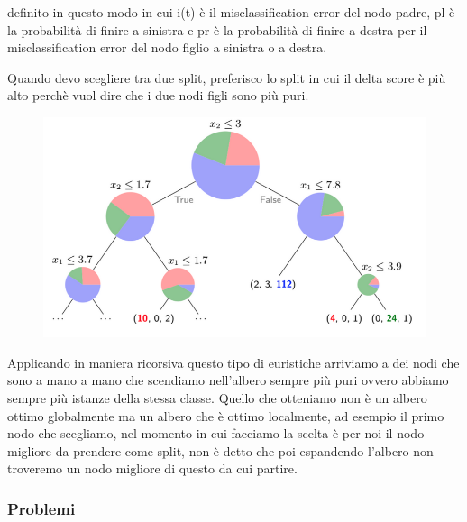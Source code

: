 \documentclass[14pt]{extreport}
\begin{document}
definito in questo modo in cui i(t) è il misclassification error del nodo padre, pl è la probabilità di finire a sinistra e pr è la probabilità di
finire a destra per il misclassification error del nodo figlio a sinistra o a destra.

Quando devo scegliere tra due split, preferisco lo split in cui il delta score è più alto perchè vuol dire che i due nodi figli sono più puri.


\begin{figure}[H]
	\centering
	\includegraphics[width=0.7\linewidth]{581.jpeg}
\end{figure}


Applicando in maniera ricorsiva questo tipo di euristiche arriviamo a dei nodi che sono a mano a mano che scendiamo nell’albero sempre più puri ovvero
abbiamo sempre più istanze della stessa classe. Quello che otteniamo non è un albero ottimo globalmente ma un albero che è ottimo localmente, ad
esempio il primo nodo che scegliamo, nel momento in cui facciamo la scelta è per noi il nodo migliore da prendere come split, non è detto che poi
espandendo l’albero non troveremo un nodo migliore di questo da cui partire.

\subsubsection{Problemi}
\end{document}

